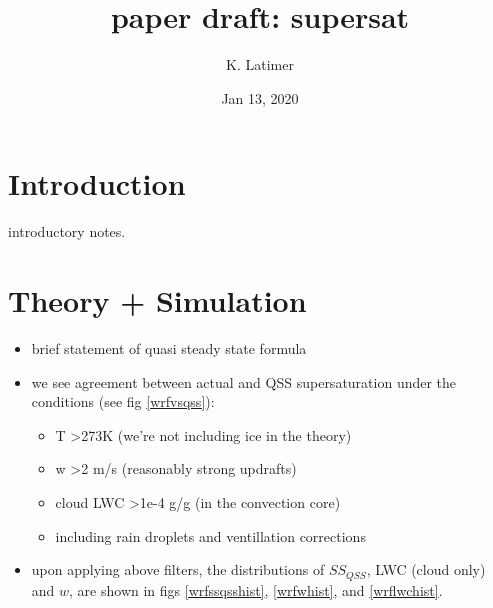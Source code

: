 \documentclass{article}
\title{paper draft: supersat}
\author{K. Latimer}
\date{Jan 13, 2020}
\begin{document}
\maketitle


\section{Introduction}
introductory notes.
\section{Theory + Simulation}
\begin{itemize}
	\item brief statement of quasi steady state formula 
	\item we see agreement between actual and QSS supersaturation under the conditions (see fig \ref{wrfvsqss}):
	\begin{itemize}
		\item T \textgreater  273K (we're not including ice in the theory)
		\item w \textgreater  2 m/s (reasonably strong updrafts)
		\item cloud LWC \textgreater  1e-4 g/g (in the convection core)
		\item including rain droplets and ventillation corrections
	\end{itemize}
	\item upon applying above filters, the distributions of $SS_{QSS}$, LWC (cloud only) and $w$, are shown in figs \ref{wrfssqsshist}, \ref{wrfwhist}, and \ref{wrflwchist}.
\end{itemize}
\end{document}
